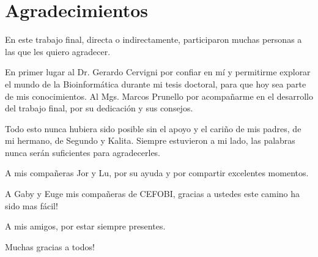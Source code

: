 
\chapter*{Agradecimientos}

\thispagestyle{empty}

En este trabajo final, directa o indirectamente, participaron muchas personas a las que les quiero agradecer.

En primer lugar al Dr. Gerardo Cervigni por confiar en mí y permitirme explorar el mundo de la Bioinformática durante mi tesis doctoral, para que hoy sea parte de mis conocimientos. Al Mgs. Marcos Prunello por acompañarme en el desarrollo del trabajo final, por su dedicación y sus consejos.

Todo esto nunca hubiera sido posible sin el apoyo y el cariño de mis padres, de mi hermano, de Segundo y Kalita. Siempre estuvieron a mi lado, las palabras nunca serán suficientes para agradecerles.

A mis compañeras Jor y Lu, por su ayuda y por compartir excelentes momentos.


A Gaby y Euge mis compañeras de CEFOBI, gracias a ustedes este camino ha sido mas fácil!

A mis amigos, por estar siempre presentes.

Muchas gracias a todos! 





